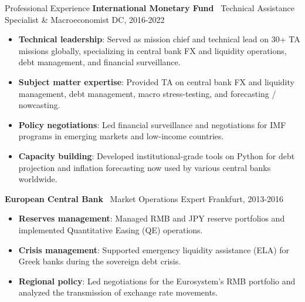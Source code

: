 \documentclass[usegeometry, 10pt, a4paper]{cv} %
\newcommand{\activite}[1]{\textbf{#1}\ }
\begin{document}
\begin{rubriquetableau}[0.95\textwidth]{Professional Experience}
\activite{International Monetary Fund} Technical Assistance Specialist \& Macroeconomist \hfill DC, 2016-2022 \\
\vspace{-0.2cm}
\begin{itemize}[]
  \item \textbf{Technical leadership}: Served as mission chief and technical lead on 30+ TA missions globally, specializing in central bank FX and liquidity operations, debt management, and financial surveillance.
  \item \textbf{Subject matter expertise}: Provided TA on central bank FX and liquidity management, debt management, macro stress-testing, and forecasting / nowcasting.
  \item \textbf{Policy negotiations}: Led financial surveillance and negotiations for IMF programs in emerging markets and low-income countries.
  \item \textbf{Capacity building}: Developed institutional-grade tools on Python for debt projection and inflation forecasting now used by various central banks worldwide.
\end{itemize}  

\vspace{0.4cm}

\activite{European Central Bank} Market Operations Expert \hfill Frankfurt, 2013-2016 \\
\vspace{-0.2cm}
\begin{itemize}[]
  \item \textbf{Reserves management}: Managed RMB and JPY reserve portfolios and implemented Quantitative Easing (QE) operations.
  \item \textbf{Crisis management}: Supported emergency liquidity assistance (ELA) for Greek banks during the sovereign debt crisis.
  \item \textbf{Regional policy}: Led negotiations for the Eurosystem's RMB portfolio and analyzed the transmission of exchange rate movements.
\end{itemize}

\end{rubriquetableau}

\newpage
\end{document}
